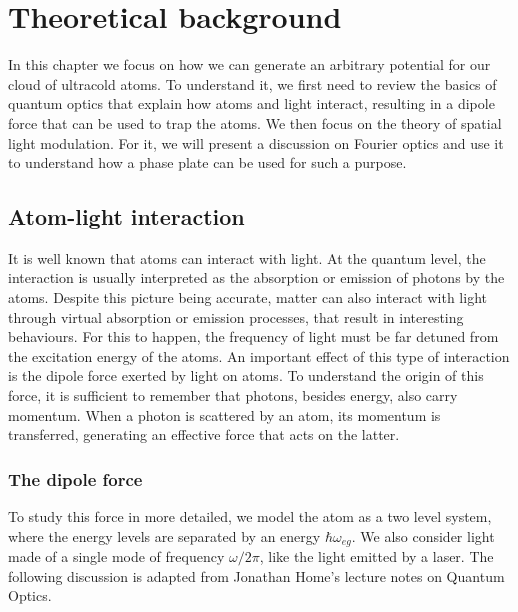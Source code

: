 \chapter{Theoretical background}
In this chapter we focus on how we can generate an arbitrary potential for our cloud of ultracold atoms. To understand it, we first need to review the basics of quantum optics that explain how atoms and light interact, resulting in a dipole force that can be used to trap the atoms. We then focus on the theory of spatial light modulation. For it, we will present a discussion on Fourier optics and use it to understand how a phase plate can be used for such a purpose.

\section{Atom-light interaction}
It is well known that atoms can interact with light. At the quantum level, the interaction is usually interpreted as the absorption or emission of photons by the atoms. Despite this picture being accurate, matter can also interact with light through virtual absorption or emission processes, that result in interesting behaviours. For this to happen, the frequency of light must be far detuned from the excitation energy of the atoms. An important effect of this type of interaction is the dipole force exerted by light on atoms. To understand the origin of this force, it is sufficient to remember that photons, besides energy, also carry momentum. When a photon is scattered by an atom, its momentum is transferred, generating an effective force that acts on the latter.

\subsection{The dipole force}

To study this force in more detailed, we model the atom as a two level system, where the energy levels are separated by an energy $\hbar \omega_{eg}$. We also consider light made of a single mode of frequency $\omega / 2\pi$, like the light emitted by a laser. The following discussion is adapted from Jonathan Home's lecture notes on Quantum Optics.

